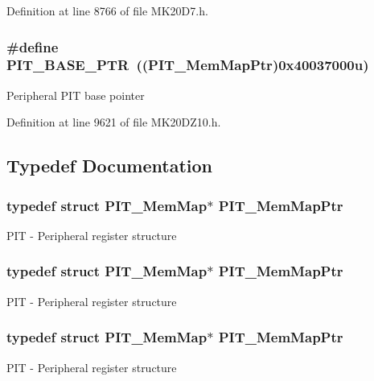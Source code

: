 Definition at line 8766 of file M\+K20\+D7.\+h.

\subsubsection[{\texorpdfstring{P\+I\+T\+\_\+\+B\+A\+S\+E\+\_\+\+P\+TR}{PIT_BASE_PTR}}]{\setlength{\rightskip}{0pt plus 5cm}\#define P\+I\+T\+\_\+\+B\+A\+S\+E\+\_\+\+P\+TR~(({\bf P\+I\+T\+\_\+\+Mem\+Map\+Ptr})0x40037000u)}\hypertarget{group___p_i_t___peripheral_ga70be45f58402a8e6d2ce4df7b23aa41c}{}\label{group___p_i_t___peripheral_ga70be45f58402a8e6d2ce4df7b23aa41c}
Peripheral P\+IT base pointer 

Definition at line 9621 of file M\+K20\+D\+Z10.\+h.



\subsection{Typedef Documentation}
\subsubsection[{\texorpdfstring{P\+I\+T\+\_\+\+Mem\+Map\+Ptr}{PIT_MemMapPtr}}]{\setlength{\rightskip}{0pt plus 5cm}typedef struct {\bf P\+I\+T\+\_\+\+Mem\+Map}$\ast$ {\bf P\+I\+T\+\_\+\+Mem\+Map\+Ptr}}\hypertarget{group___p_i_t___peripheral_ga4efe9d2676c775562cb282254af9a937}{}\label{group___p_i_t___peripheral_ga4efe9d2676c775562cb282254af9a937}
P\+IT -\/ Peripheral register structure 
\subsubsection[{\texorpdfstring{P\+I\+T\+\_\+\+Mem\+Map\+Ptr}{PIT_MemMapPtr}}]{\setlength{\rightskip}{0pt plus 5cm}typedef struct {\bf P\+I\+T\+\_\+\+Mem\+Map}$\ast$ {\bf P\+I\+T\+\_\+\+Mem\+Map\+Ptr}}\hypertarget{group___p_i_t___peripheral_ga4efe9d2676c775562cb282254af9a937}{}\label{group___p_i_t___peripheral_ga4efe9d2676c775562cb282254af9a937}
P\+IT -\/ Peripheral register structure 
\subsubsection[{\texorpdfstring{P\+I\+T\+\_\+\+Mem\+Map\+Ptr}{PIT_MemMapPtr}}]{\setlength{\rightskip}{0pt plus 5cm}typedef struct {\bf P\+I\+T\+\_\+\+Mem\+Map}$\ast$ {\bf P\+I\+T\+\_\+\+Mem\+Map\+Ptr}}\hypertarget{group___p_i_t___peripheral_ga4efe9d2676c775562cb282254af9a937}{}\label{group___p_i_t___peripheral_ga4efe9d2676c775562cb282254af9a937}
P\+IT -\/ Peripheral register structure 
